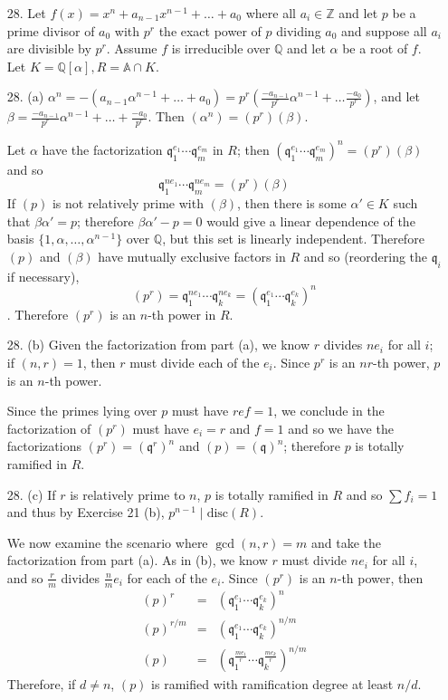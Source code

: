 \documentclass{article}
\newcommand{\Q}[0]{\mathbb{Q}}
\newcommand{\Z}[0]{\mathbb{Z}}
\newcommand{\q}[0]{\mathfrak{q}}
\newcommand{\disc}[1]{\text{disc}(#1)}
\newcommand{\ringofintegers}[1]{\mathbb{A} \cap #1}
\begin{document}
\begin{enumerate}
\item[28.] Let $f(x) = x^n + a_{n-1}x^{n-1} + \ldots + a_0$ where all $a_i \in \Z$ and let $p$ be a prime divisor of $a_0$ with $p^r$ the exact power of $p$ dividing $a_0$ and suppose all $a_i$ are divisible by $p^r$.  Assume $f$ is irreducible over $\Q$ and let $\alpha$ be a root of $f$.  Let $K = \Q[\alpha], R = \ringofintegers{K}$.
\item[28. (a)] $\alpha^n = -(a_{n-1}\alpha^{n-1} + \ldots + a_0) = p^r(\frac{-a_{n-1}}{p^r}\alpha^{n-1} + \ldots \frac{-a_0}{p^r})$, and let $\beta = \frac{-a_{n-1}}{p^r}\alpha^{n-1} + \ldots + \frac{-a_0}{p^r}$.  Then $(\alpha^n) = (p^r)(\beta)$.

Let $\alpha$ have the factorization $\q_1^{e_1} \cdots \q_m^{e_m}$ in $R$; then $(\q_1^{e_1} \cdots \q_m^{e_m})^n = (p^r)(\beta)$ and so \[ \q_1^{n e_1} \cdots \q_m^{n e_m} = (p^r)(\beta) \]
If $(p)$ is not relatively prime with $(\beta)$, then there is some $\alpha' \in K$ such that $\beta\alpha' = p$; therefore $\beta\alpha' - p = 0$ would give a linear dependence of the basis $\{1, \alpha, \ldots, \alpha^{n-1}\}$ over $\Q$, but this set is linearly independent.  Therefore $(p)$ and $(\beta)$ have mutually exclusive factors in $R$ and so (reordering the $\q_i$ if necessary), \[ (p^r) = \q_{1}^{n e_1} \cdots \q_{k}^{n e_k} = \left(\q_1^{e_1} \cdots \q_k^{e_k}\right)^n \].
Therefore $(p^r)$ is an $n$-th power in $R$.

\item[28. (b)] Given the factorization from part (a), we know $r$ divides $ne_i$ for all $i$; if $(n, r) = 1$, then $r$ must divide each of the $e_i$.  Since $p^r$ is an $nr$-th power, $p$ is an $n$-th power.

Since the primes lying over $p$ must have $ref = 1$, we conclude in the factorization of $(p^r)$ must have $e_i = r$ and $f = 1$ and so we have the factorizations $(p^r) = \left(\q^r\right)^n$ and $(p) = \left(\q\right)^n$; therefore $p$ is totally ramified in $R$.

\item[28. (c)] If $r$ is relatively prime to $n$, $p$ is totally ramified in $R$ and so $\sum f_i = 1$ and thus by Exercise 21 (b), $p^{n - 1} \mid \disc{R}$.

We now examine the scenario where $\gcd(n, r) = m$ and take the factorization from part (a).  As in (b), we know $r$ must divide $ne_i$ for all $i$, and so $\frac{r}{m}$ divides $\frac{n}{m}e_i$ for each of the $e_i$.  Since $(p^r)$ is an $n$-th power, then
\begin{eqnarray*}
(p)^r &=& \left(\q_1^{e_1} \cdots \q_k^{e_k}\right)^n \\
(p)^{r / m} &=& \left(\q_1^{e_1} \cdots \q_k^{e_k}\right)^{n / m}\\
(p) &=& \left(\q_1^{\frac{m e_1}{r}} \cdots \q_k^{\frac{m e_k}{r}}\right)^{n / m}
\end{eqnarray*}
Therefore, if $d \neq n$, $(p)$ is ramified with ramification degree at least $n / d$.


\end{enumerate}
\end{document}
